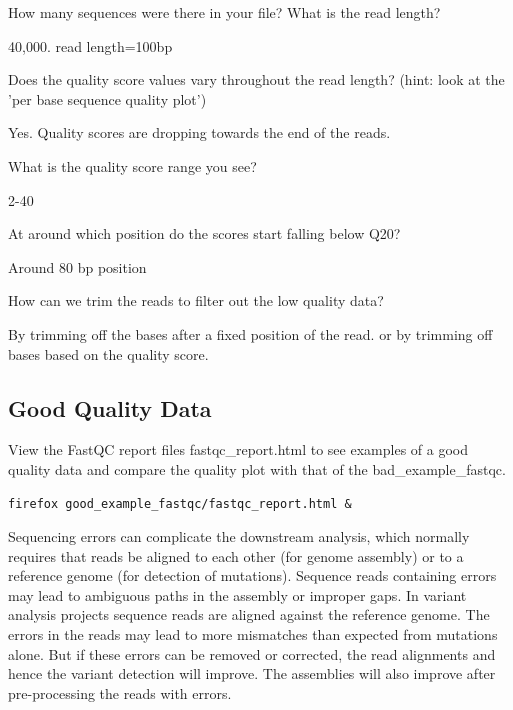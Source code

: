 \begin{questions}
How many sequences were there in your file? What is the read length?
\begin{answer}
40,000. read length=100bp
\end{answer}

Does the quality score values vary throughout the read length?
(hint: look at the 'per base sequence quality plot')
\begin{answer}
Yes. Quality scores are dropping towards the end of the reads.
\end{answer}

What is the quality score range you see?
\begin{answer}
2-40
\end{answer}

At around which position do the scores start falling below Q20? 
\begin{answer}
Around 80 bp position
\end{answer}


How can we trim the reads to filter out the low quality data?
\begin{answer}
By trimming off the bases after a fixed position of the read. or by trimming off bases based on the quality score.
\end{answer}
\end{questions}

\begin{bonus}
\subsection{Good Quality Data}
View the FastQC report files fastqc\_report.html to see examples of a good
quality data and compare the quality plot with that of the bad\_example\_fastqc.

\begin{lstlisting}
firefox good_example_fastqc/fastqc_report.html &
\end{lstlisting}
\end{bonus}

\begin{note}
Sequencing errors can complicate the downstream analysis, which normally
requires that reads be aligned to each other (for genome assembly) or to a
reference genome (for detection of mutations). Sequence reads containing errors
may lead to ambiguous paths in the assembly or improper gaps. In variant
analysis projects sequence reads are aligned against the reference genome. The
errors in the reads may lead to more mismatches than expected from
mutations alone. But if these errors can be removed or corrected, the read
alignments and hence the variant detection will improve. The assemblies will also
improve after pre-processing the reads with errors.
\end{note}

